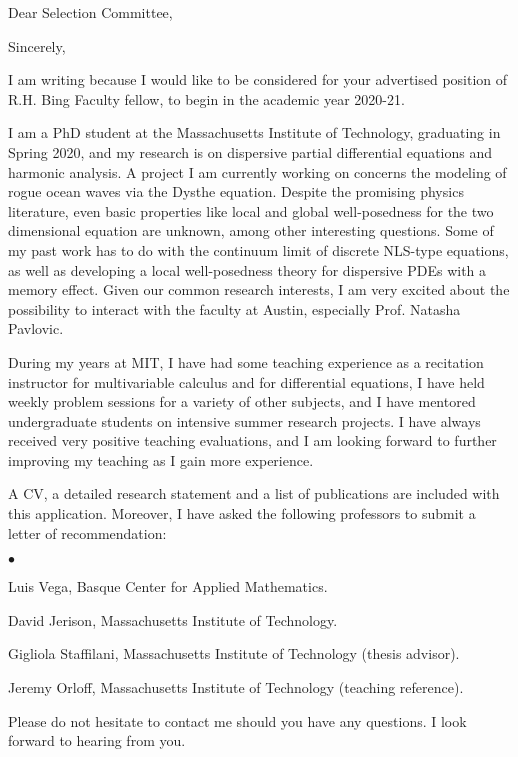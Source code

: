 %
%

\date{\today}
\opening{Dear Selection Committee,}
\closing{Sincerely,}
\makelettertitle

\justifying 

I am writing because I would like to be considered for your advertised position of R.H. Bing Faculty fellow, to begin in the academic year 2020-21.

I am a PhD student at the Massachusetts Institute of Technology, graduating in Spring 2020, and my research is on dispersive partial differential equations and harmonic analysis. A project I am currently working on concerns the modeling of rogue ocean waves via the Dysthe equation. Despite the promising physics literature, even basic properties like local and global well-posedness for the two dimensional equation are unknown, among other interesting questions. Some of my past work has to do with the continuum limit of discrete NLS-type equations, as well as developing a local well-posedness theory for dispersive PDEs with a memory effect. Given our common research interests, I am very excited about the possibility to interact with the faculty at Austin, especially Prof. Natasha Pavlovic.

During my years at MIT, I have had some teaching experience as a recitation instructor for multivariable calculus and for differential equations, I have held weekly problem sessions for a variety of other subjects, and I have mentored undergraduate students on intensive summer research projects. I have always received very positive teaching evaluations, and I am looking forward to further improving my teaching as I gain more experience.

A CV, a detailed research statement and a list of publications are included with this application. Moreover, I have asked the following professors to submit a letter of recommendation:
\begin{list}{$\bullet$}{}
\item Luis Vega, Basque Center for Applied Mathematics.
\item David Jerison, Massachusetts Institute of Technology.
\item Gigliola Staffilani, Massachusetts Institute of Technology (thesis advisor). 
\item Jeremy Orloff, Massachusetts Institute of Technology (teaching reference).
\end{list}

Please do not hesitate to contact me should you have any questions. I look forward to hearing from you.

\hspace{1.5cm}

\makeletterclosing

\clearpage

